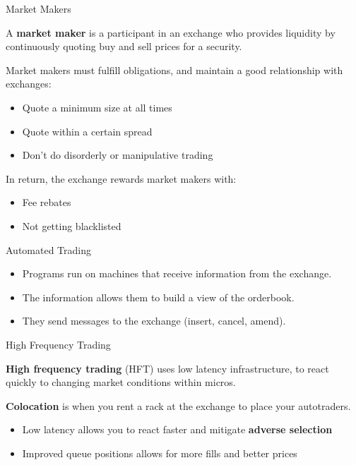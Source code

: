 \begin{frame}{Market Makers}
  \begin{sqt:definition}
    A \textbf{market maker} is a participant in an exchange who provides liquidity by continuously quoting buy and sell prices for a security.
  \end{sqt:definition}

  Market makers must fulfill obligations, and maintain a good relationship with exchanges:

  \begin{itemize}
    \item Quote a minimum size at all times
    \item Quote within a certain spread
    \item Don't do disorderly or manipulative trading
  \end{itemize}

  In return, the exchange rewards market makers with:

  \begin{itemize}
    \item Fee rebates
    \item Not getting blacklisted
  \end{itemize}
\end{frame}

\begin{frame}{Automated Trading}
  \begin{itemize}
    \item Programs run on machines that receive information from the exchange.
    \item The information allows them to build a view of the orderbook.
    \item They send messages to the exchange (insert, cancel, amend).
  \end{itemize}

  \begin{center}
    
  \end{center}
\end{frame}

\begin{frame}{High Frequency Trading}
  \begin{sqt:definition}
    \textbf{High frequency trading} (HFT) uses low latency infrastructure, to react
    quickly to changing market conditions within micros.
  \end{sqt:definition}

  \begin{sqt:definition}
    \textbf{Colocation} is when you rent a rack at the exchange to place your autotraders.
  \end{sqt:definition}

  \begin{itemize}
    \item Low latency allows you to react faster and mitigate \textbf{adverse selection}
    \item Improved queue positions allows for more fills and better prices
  \end{itemize}
\end{frame}

